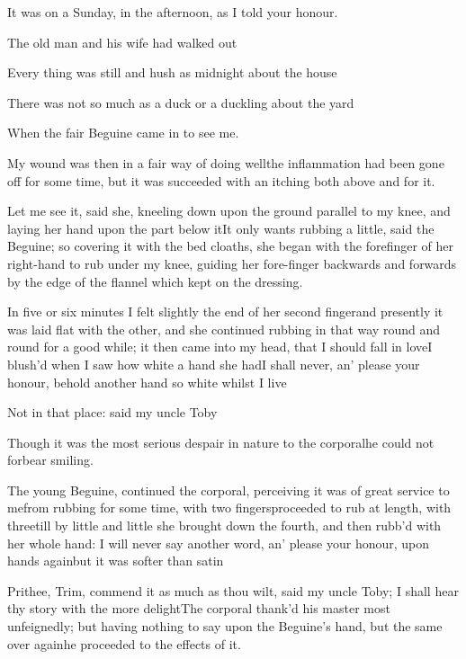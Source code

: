 \documentclass{article}
\begin{document}
It was on a Sunday, in the afternoon, as I told your
honour.

The old man and his wife had walked
out\tsh

Every thing was still and hush as midnight about the
house\tsh

There was not so much as a duck or a duckling about the
yard\tsh{}

\tsh When the fair Beguine came in to see
me.

My wound was then in a fair way of doing well\tsh the
inflammation had been gone off for some time, but it was succeeded
with an itching both above and 
for it.

Let me see it, said she, kneeling down upon the ground parallel
to my knee, and laying her hand upon the part below
it\tsh It only wants rubbing a little, said the
Beguine; so covering it with the bed cloaths, she began with
the forefinger of her right-hand to rub under my knee, guiding her
fore-finger backwards and forwards by the edge of the flannel which
kept on the dressing.

In five or six minutes I felt slightly the end of
her second finger\tsk and presently it was laid flat with the
other, and she continued rubbing in that way round and round for a
good while; it then came into my head, that I should fall in
love\tsk\break I blush’d when I saw how white a hand she
had\tsk I shall never, an’ please your honour, behold
another hand so white whilst I live\tsh

\tsh Not in that place: said my uncle
Toby\tsh

Though it was the most serious des\-pair in nature to the
corporal\tsk he could not forbear smiling.

The young Beguine, continued the corporal, perceiving it
was of great service to me\tsk from rubbing for some time, with
two fingers\tsk proceeded to rub at length, with three\tsk till
by little and little she brought down the fourth, and then
rubb’d with her whole hand: I will never say another word,
an’ please your honour, upon hands again\tsk but it was
softer than satin\tsh

\tsh Prithee, Trim, commend it as much as thou
wilt, said my uncle Toby; I shall hear thy story with the
more delight\tsh The corporal thank’d his master
most unfeignedly; but having nothing to say upon the
Beguine’s hand, but the same over again\tsh he
proceeded to the effects of it.
\end{document}
